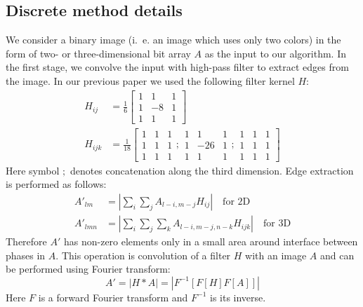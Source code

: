 \documentclass[1p]{elsarticle}
\begin{document}
\subsection{Discrete method details}
We consider a binary image (i.~e. an image which uses only two colors) in the
form of two- or three-dimensional bit array $A$ as the input to our
algorithm. In the first stage, we convolve the input with high-pass filter to
extract edges from the image. In our previous paper \cite{Samarin} we used the
following filter kernel $H$:
\begin{equation}
  \begin{aligned}
    H_{ij} &= \frac{1}{6} \left[
      \begin{array}{ccc}
        1 & 1 & 1 \\
        1 & -8 & 1 \\
        1 & 1 & 1
      \end{array}
      \right] \\
    H_{ijk} &= \frac{1}{18} \left[
      \begin{array}{ccc}
        1 & 1 & 1 \\
        1 & 1 & 1 \\
        1 & 1 & 1
      \end{array} ;
      \begin{array}{ccc}
        1 & 1 & 1 \\
        1 & -26 & 1 \\
        1 & 1 & 1
      \end{array} ;
      \begin{array}{ccc}
        1 & 1 & 1 \\
        1 & 1 & 1 \\
        1 & 1 & 1
      \end{array}
      \right]
  \end{aligned}
  \label{eq:filter-3x3}
\end{equation}
Here symbol $;$ denotes concatenation along the third dimension. Edge extraction
is performed as follows:
\begin{equation}
  \begin{aligned}
    A'_{lm}  &= \left| \sum_i\sum_j A_{l-i, m-j}H_{ij} \right| \quad \text{for 2D} \\
    A'_{lmn} &= \left| \sum_i\sum_j\sum_k A_{l-i, m-j, n-k}H_{ijk} \right| \quad \text{for 3D}
  \end{aligned}
\end{equation}
Therefore $A'$ has non-zero elements only in a small area around interface
between phases in $A$. This operation is convolution of a filter $H$ with an
image $A$ and can be performed using Fourier transform:
\begin{equation}
  A' = |H*A| = |F^{-1}[F[H] F[A]]|
\end{equation}
Here $F$ is a forward Fourier transform and $F^{-1}$ is its inverse.
\end{document}
